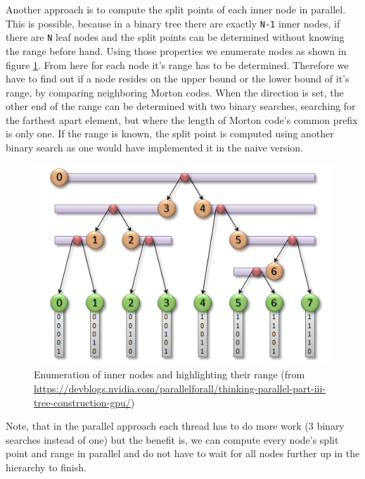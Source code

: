 \documentclass[letterpaper, 10 pt, conference]{IEEEconf}  %
\begin{document}
Another approach is to compute the split points of each inner node in parallel. This is possible, because in a binary tree there are exactly \texttt{N-1} inner nodes, if there are \texttt{N} leaf nodes and the split points can be determined without knowing the range before hand. Using those properties we enumerate nodes as shown in figure \ref{fig:nodes}. From here for each node it's range has to be determined. Therefore we have to find out if a node resides on the upper bound or the lower bound of it's range, by comparing neighboring Morton codes. When the direction is set, the other end of the range can be determined with two binary searches, searching for the farthest apart element, but where the length of Morton code's common prefix is only one. If the range is known, the split point is computed using another binary search as one would have implemented it in the naive version. 
\begin{figure}[!th]
   \centering
   \label{fig:nodes}
   \includegraphics[width=0.8\linewidth]{figures/nodes.png}
   \caption{Enumeration of inner nodes and highlighting their range (from \url{https://devblogs.nvidia.com/parallelforall/thinking-parallel-part-iii-tree-construction-gpu/})}
\end{figure}


Note, that in the parallel approach each thread has to do more work (3 binary searches instead of one) but the benefit is, we can compute every node's split point and range in parallel and do not have to wait for all nodes further up in the hierarchy to finish.


\addtolength{\textheight}{-12cm}   %
\end{document}
